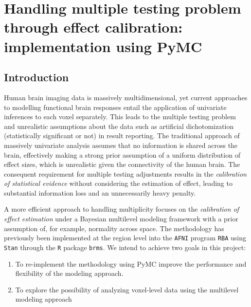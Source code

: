 \documentclass[../main.tex]{subfiles}
\begin{document}
\section{Handling multiple testing problem through effect calibration: \\implementation using PyMC}



\subsection{Introduction}

Human brain imaging data is massively multidimensional, yet current approaches to modelling functional brain responses entail the application of univariate inferences to each voxel separately. This leads to the multiple testing problem and unrealistic assumptions about the data such as artificial dichotomization (statistically significant or not) in result reporting. The traditional approach of massively univariate analysis assumes that no information is shared across the brain, effectively making a strong prior assumption of a uniform distribution of effect sizes, which is unrealistic given the connectivity of the human brain. The consequent requirement for multiple testing adjustments results in the \textit{calibration of statistical evidence} without considering the estimation of effect, leading to substantial information loss and an unnecessarily heavy penalty.

A more efficient approach to handling multiplicity focuses on the \textit{calibration of effect estimation} under a Bayesian multilevel modeling framework with a prior assumption of, for example, normality across space\cite{chenHandlingMultiplicityNeuroimaging2019}. The methodology has previously been implemented at the region level into the \texttt{AFNI} program \texttt{RBA}\cite{chen_sources_2022} using \texttt{Stan} through the \texttt{R} package \texttt{brms}\cite{burknerBrmsPackageBayesian2017}. We intend to achieve two goals in this project: 
\begin{enumerate}[label=(\roman*),nolistsep]
    \item To re-implement the methodology using PyMC improve the performance and flexibility of the modeling approach.
    \item To explore the possibility of analyzing voxel-level data using the multilevel modeling approach
\end{enumerate}
\end{document}
